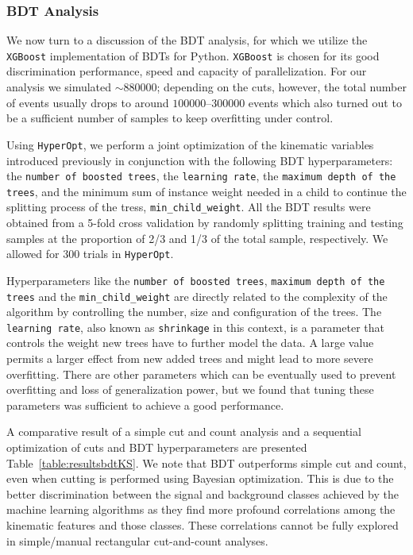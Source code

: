 \subsubsection{BDT Analysis}

We now turn to a discussion of the BDT analysis, for which we utilize the \texttt{XGBoost}  implementation of BDTs for Python. \texttt{XGBoost} is chosen for its good discrimination performance, speed and capacity of parallelization.  For our  analysis we simulated $\sim 880000$; depending on the cuts, however, the total number of events usually drops to around $100000$--$300000$ events which also turned out to be a sufficient number of samples to keep overfitting under control.

Using \texttt{HyperOpt}, we perform a joint optimization of the kinematic variables introduced previously in conjunction with the following BDT hyperparameters: the \texttt{number of boosted trees}, the \texttt{learning rate}, the \texttt{maximum depth of the trees}, and the minimum sum of instance weight needed in a child to continue the splitting process of the tress, \texttt{min\_child\_weight}. All the BDT results were obtained from a 5-fold cross validation by randomly splitting training and testing samples at the proportion of 2/3 and 1/3 of the total sample, respectively. We allowed for 300 trials in \texttt{HyperOpt}. 

Hyperparameters like the \texttt{number of boosted trees}, \texttt{maximum depth of the trees} and the \texttt{min\_child\_weight} are directly related to the complexity of the algorithm by controlling the number, size and configuration of the trees. The \texttt{learning rate}, also known as \texttt{shrinkage} in this context, is a parameter that controls the weight new trees have to further model the data. A large value permits a larger effect from new added trees and might lead to more severe overfitting. There are other parameters which can be eventually used to prevent overfitting and loss of generalization power, but we found that tuning these parameters was sufficient to achieve a good performance.


A comparative result of a simple cut and count analysis and a sequential optimization of cuts and BDT hyperparameters are presented  Table~\ref{table:resultsbdtKS}. We note that BDT outperforms simple cut and count, even when cutting is performed using Bayesian optimization. This is due to the better discrimination between the signal and background classes achieved by the machine learning algorithms as they find more profound correlations among the kinematic features and those classes. These correlations cannot be fully explored in simple/manual rectangular cut-and-count analyses. 

